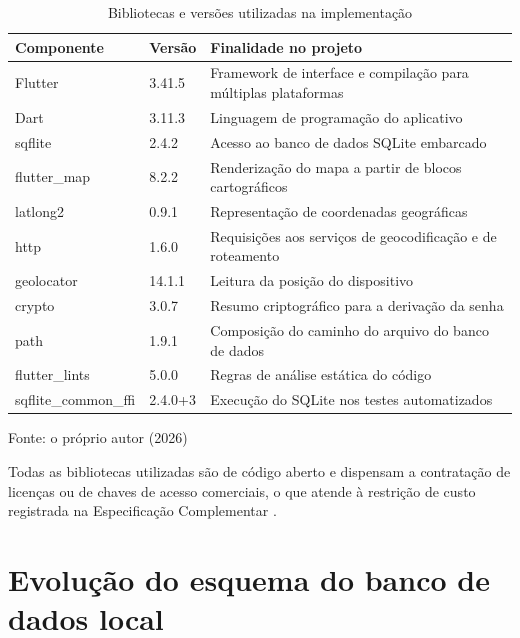 \begin{table}[!ht]
    \centering
    \caption{Bibliotecas e versões utilizadas na implementação}
    \label{tab:bibliotecas}
    \begin{tabular}{p{5cm}p{2cm}p{6cm}}
        \hline
        \textbf{Componente} & \textbf{Versão} & \textbf{Finalidade no projeto} \\
        \hline
        Flutter & 3.41.5 & Framework de interface e compilação para múltiplas plataformas \cite{flutter2024} \\
        Dart & 3.11.3 & Linguagem de programação do aplicativo \cite{dart2024} \\
        sqflite & 2.4.2 & Acesso ao banco de dados SQLite embarcado \cite{sqflite2024} \\
        flutter\_map & 8.2.2 & Renderização do mapa a partir de blocos cartográficos \cite{fluttermap2024} \\
        latlong2 & 0.9.1 & Representação de coordenadas geográficas \\
        http & 1.6.0 & Requisições aos serviços de geocodificação e de roteamento \\
        geolocator & 14.1.1 & Leitura da posição do dispositivo \cite{geolocator2024} \\
        crypto & 3.0.7 & Resumo criptográfico para a derivação da senha \\
        path & 1.9.1 & Composição do caminho do arquivo do banco de dados \\
        flutter\_lints & 5.0.0 & Regras de análise estática do código \\
        sqflite\_common\_ffi & 2.4.0+3 & Execução do SQLite nos testes automatizados \\
        \hline
    \end{tabular}
    \vspace{2pt}
    \footnotesize Fonte: o próprio autor (2026)
\end{table}

Todas as bibliotecas utilizadas são de código aberto e dispensam a contratação de licenças ou de chaves de acesso comerciais, o que atende à restrição de custo registrada na Especificação Complementar \cite{sriEspecComp2025, redhatOpenSource2024}.

\section{Evolução do esquema do banco de dados local}

